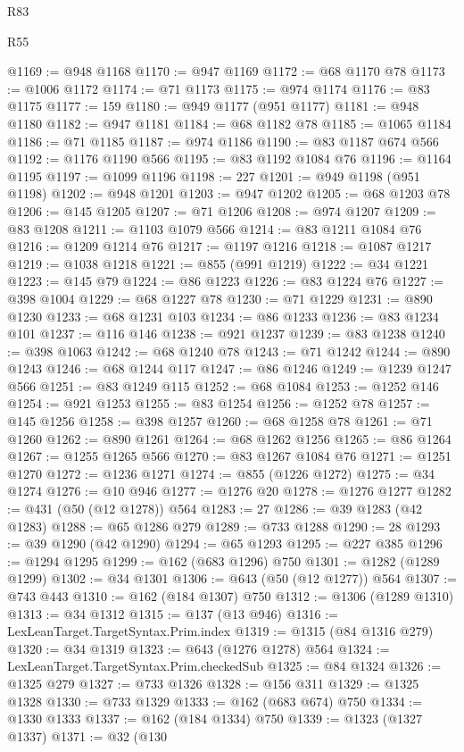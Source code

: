 \begin{lexlean}{R83}
\begin{lexlean}{R55}
\begin{coremodule}
{{{{{{{{{{{{{{{{{{{{{{{{{{{{{{{{{{{{{{{{{{{{{{{{{{{{{{{{{{{{{{@1169 := @948 @1168
@1170 := @947 @1169
@1172 := @68 @1170 @78
@1173 := @1006 @1172
@1174 := @71 @1173
@1175 := @974 @1174
@1176 := @83 @1175
@1177 := 159
@1180 := @949 @1177 (@951 @1177)
@1181 := @948 @1180
@1182 := @947 @1181
@1184 := @68 @1182 @78
@1185 := @1065 @1184
@1186 := @71 @1185
@1187 := @974 @1186
@1190 := @83 @1187 @674 @566
@1192 := @1176 @1190 @566
@1195 := @83 @1192 @1084 @76
@1196 := @1164 @1195
@1197 := @1099 @1196
@1198 := 227
@1201 := @949 @1198 (@951 @1198)
@1202 := @948 @1201
@1203 := @947 @1202
@1205 := @68 @1203 @78
@1206 := @145 @1205
@1207 := @71 @1206
@1208 := @974 @1207
@1209 := @83 @1208
@1211 := @1103 @1079 @566
@1214 := @83 @1211 @1084 @76
@1216 := @1209 @1214 @76
@1217 := @1197 @1216
@1218 := @1087 @1217
@1219 := @1038 @1218
@1221 := @855 (@991 @1219)
@1222 := @34 @1221
@1223 := @145 @79
@1224 := @86 @1223
@1226 := @83 @1224 @76
@1227 := @398 @1004
@1229 := @68 @1227 @78
@1230 := @71 @1229
@1231 := @890 @1230
@1233 := @68 @1231 @103
@1234 := @86 @1233
@1236 := @83 @1234 @101
@1237 := @116 @146
@1238 := @921 @1237
@1239 := @83 @1238
@1240 := @398 @1063
@1242 := @68 @1240 @78
@1243 := @71 @1242
@1244 := @890 @1243
@1246 := @68 @1244 @117
@1247 := @86 @1246
@1249 := @1239 @1247 @566
@1251 := @83 @1249 @115
@1252 := @68 @1084
@1253 := @1252 @146
@1254 := @921 @1253
@1255 := @83 @1254
@1256 := @1252 @78
@1257 := @145 @1256
@1258 := @398 @1257
@1260 := @68 @1258 @78
@1261 := @71 @1260
@1262 := @890 @1261
@1264 := @68 @1262 @1256
@1265 := @86 @1264
@1267 := @1255 @1265 @566
@1270 := @83 @1267 @1084 @76
@1271 := @1251 @1270
@1272 := @1236 @1271
@1274 := @855 (@1226 @1272)
@1275 := @34 @1274
@1276 := @10 @946
@1277 := @1276 @20
@1278 := @1276 @1277
@1282 := @431 (@50 (@12 @1278)) @564
@1283 := 27
@1286 := @39 @1283 (@42 @1283)
@1288 := @65 @1286 @279
@1289 := @733 @1288
@1290 := 28
@1293 := @39 @1290 (@42 @1290)
@1294 := @65 @1293
@1295 := @227 @385
@1296 := @1294 @1295
@1299 := @162 (@683 @1296) @750
@1301 := @1282 (@1289 @1299)
@1302 := @34 @1301
@1306 := @643 (@50 (@12 @1277)) @564
@1307 := @743 @443
@1310 := @162 (@184 @1307) @750
@1312 := @1306 (@1289 @1310)
@1313 := @34 @1312
@1315 := @137 (@13 @946)
@1316 := LexLeanTarget.TargetSyntax.Prim.index
@1319 := @1315 (@84 @1316 @279)
@1320 := @34 @1319
@1323 := @643 (@1276 @1278) @564
@1324 := LexLeanTarget.TargetSyntax.Prim.checkedSub
@1325 := @84 @1324
@1326 := @1325 @279
@1327 := @733 @1326
@1328 := @156 @311
@1329 := @1325 @1328
@1330 := @733 @1329
@1333 := @162 (@683 @674) @750
@1334 := @1330 @1333
@1337 := @162 (@184 @1334) @750
@1339 := @1323 (@1327 @1337)
@1371 := @32
    (@130
}}}}}}}}}}}}}}}}}}}}}}}}}}}}}}}}}}}}}}}}}}}}}}}}}}}}}}}}}}}}}}
\end{coremodule}
\end{lexlean}
\end{lexlean}
